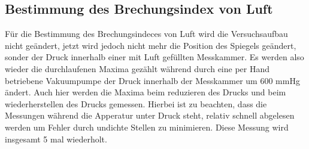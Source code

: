     \subsection{Bestimmung des Brechungsindex von Luft}

        \noindent Für die Bestimmung des Brechungsindeces von Luft wird die Versuchsaufbau nicht geändert, jetzt wird jedoch nicht mehr die Position 
        des Spiegels geändert, sonder der Druck innerhalb einer mit Luft gefüllten Messkammer. Es werden also wieder die durchlaufenen Maxima 
        gezählt während durch eine per Hand betriebene Vakuumpumpe der Druck innerhalb der Messkammer um 600 mmHg ändert. Auch hier werden 
        die Maxima beim reduzieren des Drucks und beim wiederherstellen des Drucks gemessen. Hierbei ist zu beachten, dass die Messungen während 
        die Apperatur unter Druck steht, relativ schnell abgelesen werden um Fehler durch undichte Stellen zu minimieren. Diese Messung 
        wird insgesamt 5 mal wiederholt.



